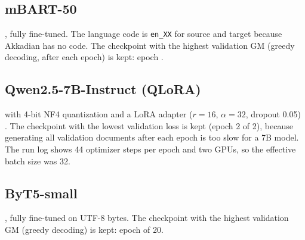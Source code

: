 \documentclass[a4paper,12pt]{article}
\begin{document}
\subsection{mBART-50}
 \cite{mbart}, fully fine-tuned. The language code is \texttt{en\_XX} for source and target because Akkadian has no code. The checkpoint with the highest validation GM (greedy decoding, after each epoch) is kept: epoch \MbBestEpoch.

\subsection{Qwen2.5-7B-Instruct (QLoRA)}
 \cite{qwen} with 4-bit NF4 quantization and a LoRA adapter ($r=16$, $\alpha=32$, dropout 0.05) \cite{lora,qlora}. The checkpoint with the lowest validation loss is kept (epoch 2 of 2), because generating all validation documents after each epoch is too slow for a 7B model. The run log shows 44 optimizer steps per epoch and two GPUs, so the effective batch size was 32.

\subsection{ByT5-small}
 \cite{byt5}, fully fine-tuned on UTF-8 bytes. The checkpoint with the highest validation GM (greedy decoding) is kept: epoch \BtBestEpoch{} of 20.
\end{document}
